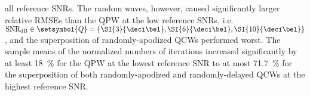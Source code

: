 all reference \acp{SNR}.
The random waves, however, caused
significantly larger relative \acp{RMSE} than
the \ac{QPW} at
the low reference \acp{SNR}, i.e.
$\text{SNR}_{\text{dB}} \in \setsymbol{Q} = \{ \SI{3}{\deci\bel}, \SI{6}{\deci\bel}, \SI{10}{\deci\bel} \}$, and
the superposition of
randomly-apodized \acp{QCW} performed
worst.
%
%
%
%
% 
The sample means of
the normalized numbers of
iterations increased significantly by
at least \SI{18}{\percent} for
the \ac{QPW} at
the lowest reference \ac{SNR} to
at most \SI{71.7}{\percent} for
the superposition of both
randomly-apodized and
randomly-delayed \acp{QCW} at
the highest reference \ac{SNR}.
